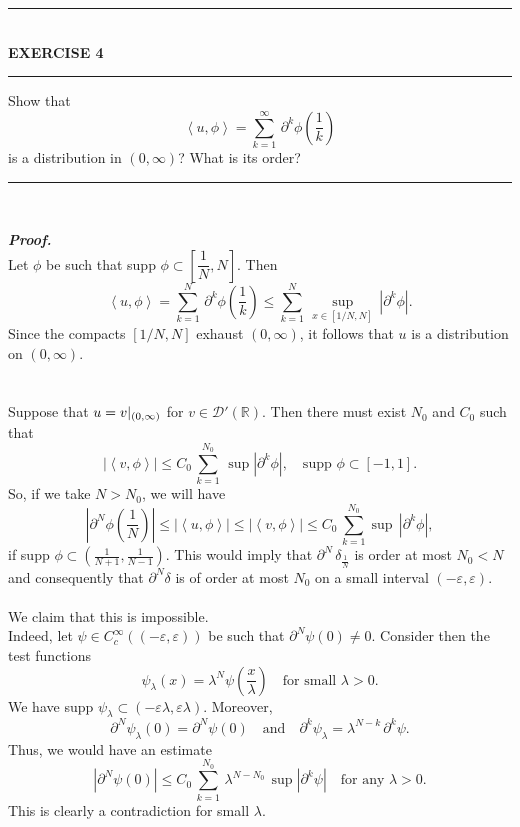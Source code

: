 \documentclass[a4paper,11pt]{article}
\begin{document}
	\begin{flushleft}
		\rule[-0.5ex]{17cm}{2pt}\\
			\textbf{EXERCISE 4}\\
		\rule[1.5ex]{17cm}{0.5pt}
			Show that
				$$\left<u,\phi\right> = \overset{\infty}{\underset{k = 1}{\sum}}\,\partial^k \phi(\frac{1}{k})$$
			is a distribution in $(0,\infty)$? What is its order?
		\rule[1.0ex]{17cm}{0.5pt}\
	\end{flushleft}
	\textbf{\textit{Proof.}}\\
		Let $\phi$ be such that supp $\phi \subset [\dfrac{1}{N}, N]$. Then
			$$\left<u, \phi\right>
			= \sum_{k=1}^N\,\partial^k\phi(\frac{1}{k})
			\leq \sum_{k=1}^N\,\underset{x \in [1/N,N]}{\sup}\,|\partial^k \phi|.$$
		Since the compacts $[1/N,N]$ exhaust $(0,\infty)$, it follows that $u$ is a distribution on $(0,\infty)$.\\\\\\
		Suppose that $u = v \arrowvert_{(0,\infty)}$ for $v \in \mathcal{D}'(\mathbb{R})$. Then there must exist $N_0$ and $C_0$ such that
			$$|\left<v,\phi\right>|
			\leq C_0\,\sum_{k=1}^{N_0}\,\sup|\partial^k \phi|,
			\quad \text{supp } \phi \subset [-1,1].$$
		So, if we take $N > N_0$, we will have
			$$\left|\partial^N \phi(\frac{1}{N})\right|
			\leq |\left<u,\phi\right>|
			\leq |\left<v,\phi\right>|
			\leq C_0 \,\sum_{k=1}^{N_0} \sup\,|\partial^k \phi|,$$
		if supp $\phi \subset \left(\frac{1}{N+1}, \frac{1}{N-1}\right)$. This would imply that $\partial^N\,\delta_{\frac{1}{N}}$ is order at most $N_0 < N$ and consequently that $\partial^N \delta$ is of order at most $N_0$ on a small interval $(-\varepsilon, \varepsilon)$.\\\\
		We claim that this is impossible.\\
		Indeed, let $\psi \in C_c^\infty ((-\varepsilon, \varepsilon))$ be such that $\partial^N \psi(0) \neq 0$. Consider then the test functions
			$$\psi_\lambda(x) = \lambda^N \psi(\frac{x}{\lambda})
			\quad \text{for small }\lambda > 0.$$
		We have supp $\psi_\lambda \subset (-\varepsilon \lambda, \varepsilon \lambda)$. Moreover,
			$$\partial^N \psi_\lambda (0) = \partial^N \psi(0)
			\quad \text{and} \quad
			\partial^k \psi_\lambda = \lambda^{N - k}\,\partial^k \psi.$$
		Thus, we would have an estimate
			$$|\partial^N \psi(0)|
			\leq C_0\,\sum_{k=1}^{N_0}\,\lambda^{N-N_0}\,\sup|\partial^k \psi|
			\quad \text{for any }\lambda > 0.$$
		This is clearly a contradiction for small $\lambda$.\\
\end{document}
